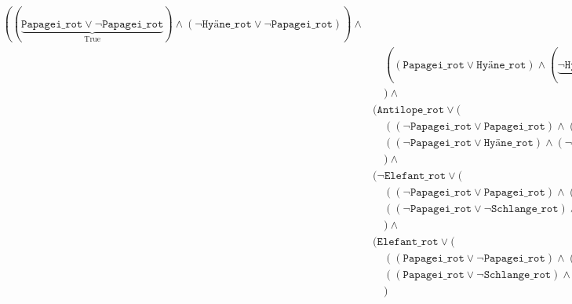 \documentclass[a4paper,draft=false,oneside,12pt,ngerman]{scrreprt}
\begin{document}
\begin{align*}
                ((\underbrace{\texttt{Papagei\_rot} \lor \neg \texttt{Papagei\_rot}}_{\text{True}}) \land
                (\neg \texttt{Hyäne\_rot} \lor \neg \texttt{Papagei\_rot})) \land \\ & \quad
                ((\texttt{Papagei\_rot} \lor \texttt{Hyäne\_rot}) \land
                (\underbrace{\neg \texttt{Hyäne\_rot} \lor \texttt{Hyäne\_rot}}_{\text{True}})) \land \\ & \quad
            ) \land \\ &
            (\texttt{Antilope\_rot} \lor ( \\ & \quad
                ((\neg \texttt{Papagei\_rot} \lor \texttt{Papagei\_rot}) \land
                (\neg\texttt{Hyäne\_rot}) \lor \texttt{Papagei\_rot}) \land \\ & \quad
                ((\neg \texttt{Papagei\_rot} \lor \texttt{Hyäne\_rot}) \land
                (\neg\texttt{Hyäne\_rot} \lor \texttt{Hyäne\_rot})) \\ & \quad
            ) \land \\ &
            (\neg \texttt{Elefant\_rot} \lor ( \\ & \quad
                ((\neg \texttt{Papagei\_rot} \lor \texttt{Papagei\_rot}) \land
                (\texttt{Schlange\_rot}) \lor \texttt{Papagei\_rot}) \land \\ & \quad
                ((\neg \texttt{Papagei\_rot} \lor \neg \texttt{Schlange\_rot}) \land
                (\texttt{Schlange\_rot} \lor \neg \texttt{Schlange\_rot})) \\ & \quad
            ) \land \\ &
            (\texttt{Elefant\_rot} \lor ( \\ & \quad
                ((\texttt{Papagei\_rot} \lor \neg \texttt{Papagei\_rot}) \land
                (\texttt{Schlange\_rot} \lor \neg \texttt{Papagei\_rot})) \land \\ & \quad
                ((\texttt{Papagei\_rot} \lor \neg \texttt{Schlange\_rot}) \land
                (\texttt{Schlange\_rot} \lor \neg \texttt{Schlange\_rot})) \\ & \quad
            ) \\
\end{align*}
\end{document}
